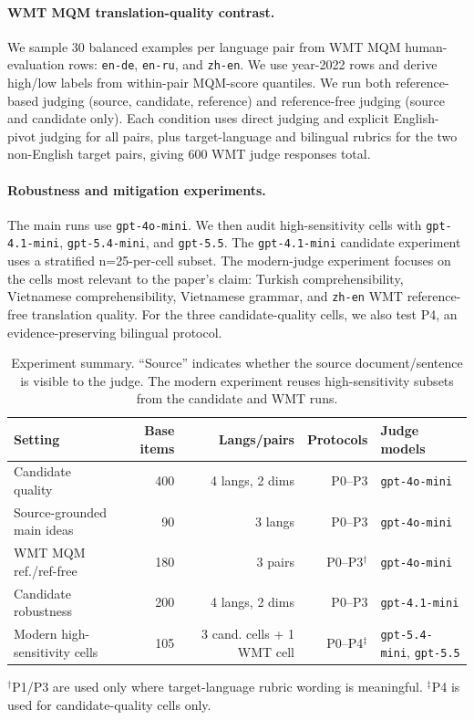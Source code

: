 \documentclass{article}
\begin{document}
\paragraph{WMT MQM translation-quality contrast.}
We sample 30 balanced examples per language pair from WMT MQM human-evaluation rows: \texttt{en-de}, \texttt{en-ru}, and \texttt{zh-en}. We use year-2022 rows and derive high/low labels from within-pair MQM-score quantiles. We run both reference-based judging (source, candidate, reference) and reference-free judging (source and candidate only). Each condition uses direct judging and explicit English-pivot judging for all pairs, plus target-language and bilingual rubrics for the two non-English target pairs, giving 600 WMT judge responses total.

\paragraph{Robustness and mitigation experiments.}
The main runs use \texttt{gpt-4o-mini}. We then audit high-sensitivity cells with \texttt{gpt-4.1-mini}, \texttt{gpt-5.4-mini}, and \texttt{gpt-5.5}. The \texttt{gpt-4.1-mini} candidate experiment uses a stratified n=25-per-cell subset. The modern-judge experiment focuses on the cells most relevant to the paper's claim: Turkish comprehensibility, Vietnamese comprehensibility, Vietnamese grammar, and \texttt{zh-en} WMT reference-free translation quality. For the three candidate-quality cells, we also test P4, an evidence-preserving bilingual protocol.

\begin{table}[t]
\centering
\caption{Experiment summary. ``Source'' indicates whether the source document/sentence is visible to the judge. The modern experiment reuses high-sensitivity subsets from the candidate and WMT runs.}
\label{tab:dataset_sampling_audit}
\small
\setlength{\tabcolsep}{4pt}
\begin{tabular*}{\linewidth}{@{\extracolsep{\fill}}lrrrl}
\toprule
Setting & Base items & Langs/pairs & Protocols & Judge models \\
\midrule
Candidate quality & 400 & 4 langs, 2 dims & P0--P3 & \texttt{gpt-4o-mini} \\
Source-grounded main ideas & 90 & 3 langs & P0--P3 & \texttt{gpt-4o-mini} \\
WMT MQM ref./ref-free & 180 & 3 pairs & P0--P3$^\dagger$ & \texttt{gpt-4o-mini} \\
Candidate robustness & 200 & 4 langs, 2 dims & P0--P3 & \texttt{gpt-4.1-mini} \\
Modern high-sensitivity cells & 105 & 3 cand. cells + 1 WMT cell & P0--P4$^\ddagger$ & \texttt{gpt-5.4-mini}, \texttt{gpt-5.5} \\
\bottomrule
\end{tabular*}
\vspace{2pt}
\footnotesize $^\dagger$P1/P3 are used only where target-language rubric wording is meaningful. $^\ddagger$P4 is used for candidate-quality cells only.
\end{table}
\end{document}
